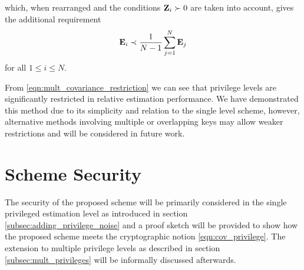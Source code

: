 \documentclass[letterpaper, 10 pt, conference]{IEEEtran}
\theoremstyle{definition}
\theoremstyle{definition}
\theoremstyle{remark}
\begin{document}
which, when rearranged and the conditions ${{\mathbf{Z}}}_i\succ 0$ are taken into account, gives the additional requirement
\begin{equation}\label{eqn:mult_covariance_restriction}
   \mat{E}_i \prec \frac{1}{N-1}\sum_{j=1}^{N}\mat{E}_j
\end{equation}
for all $1 \leq i \leq N$.

From \eqref{eqn:mult_covariance_restriction} we can see that privilege levels are significantly restricted in relative estimation performance. We have demonstrated this method due to its simplicity and relation to the single level scheme, however, alternative methods involving multiple or overlapping keys may allow weaker restrictions and will be considered in future work.

% 
%                                                                                        
%                                                                                        
%                                                                                        
% 

\section{Scheme Security}\label{sec:scheme_security}
The security of the proposed scheme will be primarily considered in the single privileged estimation level as introduced in section \ref{subsec:adding_privilege_noise} and a proof sketch will be provided to show how the proposed scheme meets the cryptographic notion \eqref{eqn:cov_privilege}. The extension to multiple privilege levels as described in section \ref{subsec:mult_privileges} will be informally discussed afterwards.

% 
% 
\end{document}
